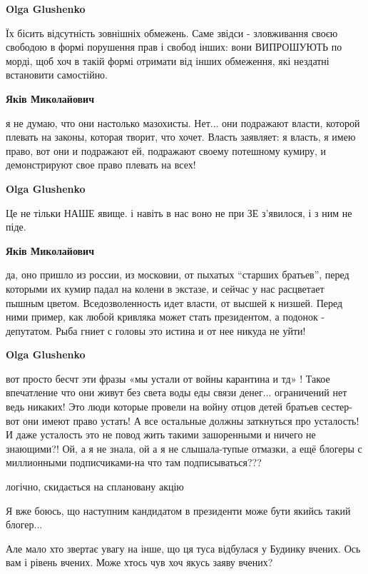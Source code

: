 \begin{itemize}
\begin{itemize}
\textbf{Olga Glushenko} 

Їх бісить відсутність зовнішніх обмежень. Саме звідси - зловживання своєю
свободою в формі порушення прав і свобод інших: вони ВИПРОШУЮТЬ по морді, щоб
хоч в такій формі отримати від інших обмеження, які нездатні встановити
самостійно.

\textbf{Яків Миколайович} 

я не думаю, что они настолько мазохисты. Нет... они подражают власти, которой
плевать на законы, которая творит, что хочет. Власть заявляет: я власть, я имею
право, вот они и подражают ей, подражают своему потешному кумиру, и демонстрируют
свое право плевать на всех!


\textbf{Olga Glushenko} 

Це не тільки НАШЕ явище. і навіть в нас воно не при ЗЕ з'явилося, і з ним не
піде.


\textbf{Яків Миколайович} 

да, оно пришло из россии, из московии, от пыхатых \enquote{старших братьев}, перед которыми
их кумир падал на колени в экстазе, и сейчас у нас расцветает пышным цветом.
Вседозволенность идет власти, от высшей к низшей. Перед ними пример, как любой
кривляка может стать президентом, а подонок - депутатом. Рыба гниет с головы это
истина и от нее никуда не уйти!

\textbf{Olga Glushenko} 

вот просто бесчт эти фразы «мы устали от войны карантина и тд» ! Такое
впечатление что они живут без света воды еды связи денег... ограничений нет ведь
никаких! Это люди которые провели на войну отцов детей братьев сестер-вот они
имеют право устать! А все остальные должны заткнуться про усталость! И даже
усталость это не повод жить такими зашоренными и ничего не знающими?! Ой, а я
не знала, ой а я не слышала-тупые отмазки, а ещё блогеры с миллионными
подписчиками-на что там подписываться???

\end{itemize} %

логічно, скидається на сплановану акцію

Я вже боюсь, що наступним кандидатом в президенти може бути якийсь такий блогер...


Але мало хто звертає увагу на інше, що ця туса відбулася у Будинку вчених. Ось
вам і рівень вчених. Може хтось чув хоч якусь заяву вчених?


\end{itemize}
